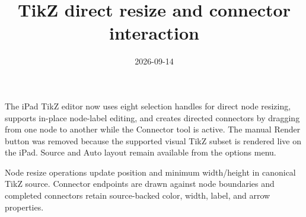 \documentclass[a4paper]{article}
\title{TikZ direct resize and connector interaction}
\date{2026-09-14}
\author{}
\begin{document}
\maketitle

\begin{preview}
The iPad TikZ editor now uses eight selection handles for direct node resizing,
supports in-place node-label editing, and creates directed connectors by dragging
from one node to another while the Connector tool is active. The manual Render
button was removed because the supported visual TikZ subset is rendered live on
the iPad. Source and Auto layout remain available from the options menu.

Node resize operations update position and minimum width/height in canonical
TikZ source. Connector endpoints are drawn against node boundaries and completed
connectors retain source-backed color, width, label, and arrow properties.
\end{preview}
\end{document}
